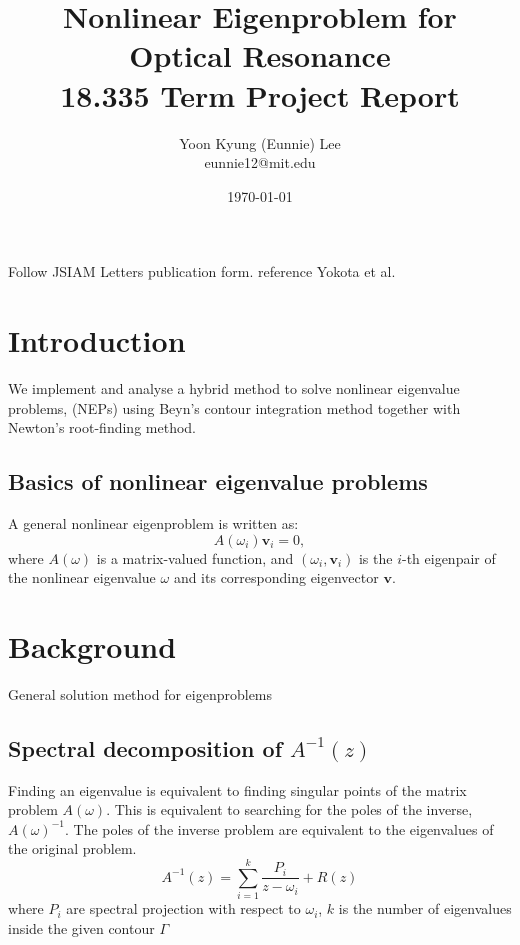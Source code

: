 \documentclass[11pt,letterpaper]{article}
\author{Yoon Kyung (Eunnie) Lee \\eunnie12@mit.edu}
\title{\textbf{Nonlinear Eigenproblem for Optical Resonance}\\18.335 Term Project Report}
\date{\today}
\begin{document}
\maketitle

\begin{multicols}{2}
Follow JSIAM Letters publication form. 
reference Yokota et al. 

\section{Introduction}
We implement and analyse a hybrid method to solve nonlinear eigenvalue problems, (NEPs) using Beyn's contour integration method \citep{beyn_integral_2012} together with Newton's root-finding method. 

\subsection*{Basics of nonlinear eigenvalue problems}
A general nonlinear eigenproblem is written as:
\begin{equation}\label{eq:Eig}
    A(\omega_i) \mathbf{v}_i = 0,
\end{equation}
where $A(\omega)$ is a matrix-valued function, and $(\omega_i, \mathbf{v}_i)$ is the $i$-th eigenpair of the nonlinear eigenvalue $\omega$ and its corresponding eigenvector $\mathbf{v}$. 

\section{Background}
General solution method for eigenproblems

\subsection{Spectral decomposition of $A^{-1}(z)$}
Finding an eigenvalue is equivalent to finding singular points of the matrix problem $A(\omega)$. This is equivalent to searching for the poles of the inverse, $A(\omega)^{-1}$. The poles of the inverse problem are equivalent to the eigenvalues of the original problem.
\begin{equation}\label{Keldish}
A^{-1}(z) = \sum\limits_{i=1}^{k}\frac{P_i}{z-\omega_i}+R(z)
\end{equation}
where $P_i$ are spectral projection with respect to $\omega_i$, $k$ is the number of eigenvalues inside the given contour $\Gamma$ 

\end{multicols}
\end{document}
